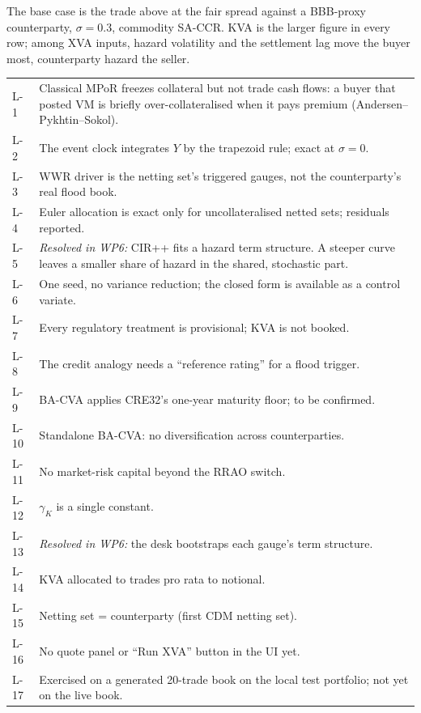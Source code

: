 \documentclass[11pt,a4paper]{article}
\begin{document}


The base case is the trade above at the fair spread against a BBB-proxy
counterparty, $\sigma=0.3$, commodity SA-CCR. KVA is the larger figure in
every row; among XVA inputs, hazard volatility and the settlement lag move the
buyer most, counterparty hazard the seller.

\mkmlimitations\label{sec:limits}

\begin{longtable}{p{1cm}p{13.5cm}}
\toprule
L-1 & Classical MPoR freezes collateral but not trade cash flows: a buyer that posted VM is briefly over-collateralised when it pays premium (Andersen--Pykhtin--Sokol). \\
L-2 & The event clock integrates $Y$ by the trapezoid rule; exact at $\sigma=0$. \\
L-3 & WWR driver is the netting set's triggered gauges, not the counterparty's real flood book. \\
L-4 & Euler allocation is exact only for uncollateralised netted sets; residuals reported. \\
L-5 & \emph{Resolved in WP6:} CIR++ fits a hazard term structure. A steeper curve leaves a smaller share of hazard in the shared, stochastic part. \\
L-6 & One seed, no variance reduction; the closed form is available as a control variate. \\
L-7 & Every regulatory treatment is provisional; KVA is not booked. \\
L-8 & The credit analogy needs a ``reference rating'' for a flood trigger. \\
L-9 & BA-CVA applies CRE32's one-year maturity floor; to be confirmed. \\
L-10 & Standalone BA-CVA: no diversification across counterparties. \\
L-11 & No market-risk capital beyond the RRAO switch. \\
L-12 & $\gamma_K$ is a single constant. \\
L-13 & \emph{Resolved in WP6:} the desk bootstraps each gauge's term structure. \\
L-14 & KVA allocated to trades pro rata to notional. \\
L-15 & Netting set = counterparty (first CDM netting set). \\
L-16 & No quote panel or ``Run XVA'' button in the UI yet. \\
L-17 & Exercised on a generated 20-trade book on the local test portfolio; not yet on the live book. \\
\bottomrule
\end{longtable}
\end{document}
